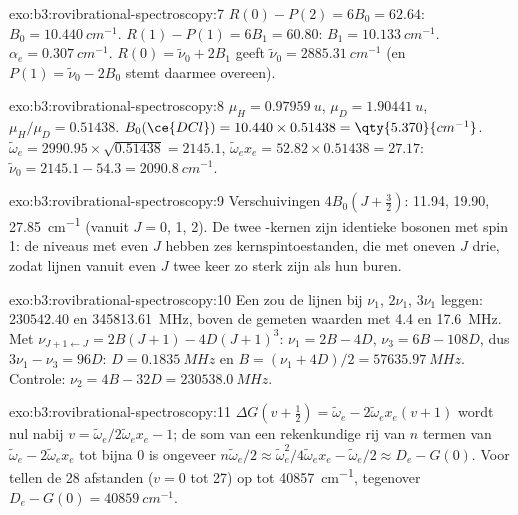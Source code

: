\begin{solution}{exo:b3:rovibrational-spectroscopy:7}
$R(0) - P(2) = 6B_0 = 62.64$: $B_0 = \qty{10.440}{cm^{-1}}$. $R(1) - P(1) = 6B_1 = 60.80$:
$B_1 = \qty{10.133}{cm^{-1}}$. $\alpha_e = \qty{0.307}{cm^{-1}}$. $R(0) = \tilde\nu_0 + 2B_1$ geeft
$\tilde\nu_0 = \qty{2885.31}{cm^{-1}}$ (en $P(1) = \tilde\nu_0 - 2B_0$ stemt
daarmee overeen).
\end{solution}

\begin{solution}{exo:b3:rovibrational-spectroscopy:8}
$\mu_H = \qty{0.97959}{u}$, $\mu_D = \qty{1.90441}{u}$, $\mu_H/\mu_D = 0.51438$. $B_0(\ce{DCl})
= 10.440 \times 0.51438 = \qty{5.370}{cm^{-1}}$. $\tilde\omega_e = 2990.95 \times \sqrt{0.51438}
= 2145.1$, $\tilde\omega_ex_e = 52.82 \times 0.51438 = 27.17$: $\tilde\nu_0 = 2145.1 - 54.3 =
\qty{2090.8}{cm^{-1}}$.
\end{solution}

\begin{solution}{exo:b3:rovibrational-spectroscopy:9}
Verschuivingen $4B_0(J + \frac32)$: 11.94, 19.90, \qty{27.85}{cm^{-1}} (vanuit $J = 0$, 1, 2). De
twee -kernen zijn identieke bosonen met spin 1: de niveaus met
even $J$ hebben zes kernspintoestanden, die met oneven $J$ drie, zodat
lijnen vanuit even $J$ twee keer zo sterk zijn als hun buren.
\end{solution}

\begin{solution}{exo:b3:rovibrational-spectroscopy:10}
Een  zou de lijnen bij $\nu_1$, $2\nu_1$, $3\nu_1$ leggen: $230542.40$ en
\qty{345813.61}{MHz}, boven de gemeten waarden met 4.4 en \qty{17.6}{MHz}. Met
$\nu_{J+1\leftarrow J} = 2B(J+1) - 4D(J+1)^3$: $\nu_1 = 2B - 4D$, $\nu_3 = 6B - 108D$, dus
$3\nu_1 - \nu_3 = 96D$: $D = \qty{0.1835}{MHz}$ en $B = (\nu_1 + 4D)/2 =
\qty{57635.97}{MHz}$. Controle: $\nu_2 = 4B - 32D = \qty{230538.0}{MHz}$.
\end{solution}

\begin{solution}{exo:b3:rovibrational-spectroscopy:11}
$\Delta G(v + \frac12) = \tilde\omega_e - 2\tilde\omega_ex_e(v+1)$ wordt nul nabij $v =
\tilde\omega_e/2\tilde\omega_ex_e - 1$; de som van een rekenkundige rij van $n$ termen
van $\tilde\omega_e - 2\tilde\omega_ex_e$ tot bijna 0 is ongeveer $n\tilde\omega_e/2 \approx
\tilde\omega_e^2/4\tilde\omega_ex_e - \tilde\omega_e/2 \approx D_e - G(0)$. Voor  tellen de 28 afstanden
($v = 0$ tot 27) op tot \qty{40857}{cm^{-1}}, tegenover $D_e - G(0) = \qty{40859}{cm^{-1}}$.
\end{solution}

